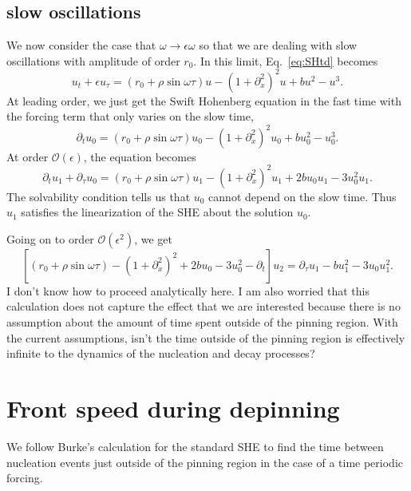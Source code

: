 \documentclass[pre,preprint,superscriptaddress]{revtex4-1}
\begin{document}
\subsection{slow oscillations}
We now consider the case that $\omega\rightarrow \epsilon \omega$ so that we are dealing with slow oscillations with amplitude of order $r_0$.  In this limit, Eq.~\ref{eq:SHtd} becomes
\begin{equation}
u_t+ \epsilon u_{\tau}=(r_0+ \rho \sin\omega \tau) u-\left(1+\partial_{x}^2\right)^2u+b u^2-u^3 \label{eq:SH}.
\end{equation}
At leading order, we just get the Swift Hohenberg equation in the fast time with the forcing term that only varies on the slow time,
\begin{equation}
\partial_t u_0=(r_0+ \rho \sin\omega \tau) u_0-\left(1+\partial_{x}^2\right)^2u_0+b u_0^2-u_0^3 \label{eq:SH}.
\end{equation}
At order $\mathcal{O}(\epsilon)$, the equation becomes
\begin{equation}
\partial_t u_1+ \partial_{\tau} u_0=(r_0+ \rho \sin\omega \tau) u_1-\left(1+\partial_{x}^2\right)^2u_1+2 b u_0 u_1-3u_0^2 u_1 \label{eq:SH}.
\end{equation}
The solvability condition tells us that $u_0$ cannot depend on the slow time. Thus $u_1$ satisfies the linearization of the SHE about the solution $u_0$.  

Going on to order  $\mathcal{O}(\epsilon^2)$, we get 
\begin{equation}
\left[(r_0+ \rho \sin\omega \tau) -\left(1+\partial_{x}^2\right)^2+2 b u_0 -3u_0^2-\partial_t \right]u_2 =\partial_{\tau}u_1-bu_1^2-3u_0u_1^2\label{eq:SH}.
\end{equation}
I don't know how to proceed analytically here.  I am also worried that this calculation does not capture the effect that we are interested because there is no assumption about the amount of time spent outside of the pinning region.  With the current assumptions, isn't the time outside of the pinning region is effectively infinite to the dynamics of the nucleation and decay processes?

\section{Front speed during depinning}
We follow Burke's calculation for the standard SHE to find the time between nucleation events just outside of the pinning region in the case of a time periodic forcing.  
\end{document}
